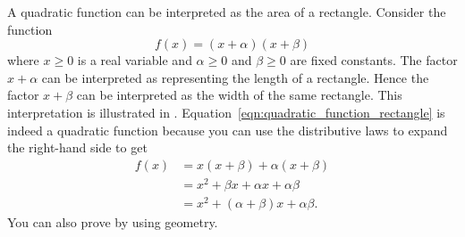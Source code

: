 \documentclass[a4paper,oneside,12pt]{article}
\begin{document}
A quadratic function can be interpreted as the area of a rectangle.
Consider the function
\begin{equation}
\label{eqn:quadratic_function_rectangle}
f(x)
=
(x + \alpha)(x + \beta)
\end{equation}
where $x \geq 0$ is a real variable and $\alpha \geq 0$ and
$\beta \geq 0$ are fixed constants.  The factor $x + \alpha$ can be
interpreted as representing the length of a rectangle.  Hence the
factor $x + \beta$ can be interpreted as the width of the same
rectangle.  This interpretation is illustrated in
.
Equation~\eqref{eqn:quadratic_function_rectangle} is indeed a
quadratic function because you can use the distributive laws to expand
the right-hand side to get
\begin{equation}
\label{eqn:rectangle_as_quadratic}
\begin{aligned}
f(x)
&=
x(x + \beta) + \alpha(x + \beta) \\[4pt]
&=
x^2 + \beta x + \alpha x + \alpha\beta \\[4pt]
&=
x^2 + (\alpha + \beta)x + \alpha\beta.
\end{aligned}
\end{equation}
You can also prove  by using
geometry.
\end{document}
